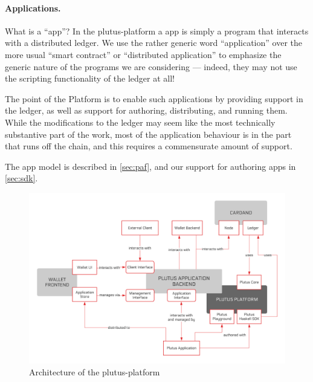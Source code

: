 \paragraph{Applications.}
What is a ``\gls{app}''?
In the \gls{plutus-platform} a \gls{app} is simply a program that interacts with a distributed ledger.
We use the rather generic word ``application'' over the more usual ``smart contract'' or ``distributed application'' to emphasize the generic nature of the programs we are considering --- indeed, they may not use the scripting functionality of the ledger at all!

The point of the Platform is to enable such applications by providing support in the ledger, as well as support for authoring, distributing, and running them.
While the modifications to the ledger may seem like the most technically substantive part of the work, most of the application behaviour is in the part that runs off the chain, and this requires a commensurate amount of support.

The \gls{app} model is described in \cref{sec:paf}, and our support for authoring \glspl{app} in \cref{sec:sdk}.

\begin{figure}[t]
  \centering
  \includegraphics[width=\textwidth]{paf-architecture.pdf}
  \caption{Architecture of the \gls{plutus-platform}}
  \label{fig:platform-architecture}
\end{figure}
